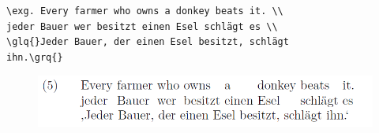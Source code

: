 \begin{frame}[fragile]


\begin{lstlisting}
\exg. Every farmer who owns a donkey beats it. \\
jeder Bauer wer besitzt einen Esel schlägt es \\
\glq{}Jeder Bauer, der einen Esel besitzt, schlägt 
ihn.\grq{}
\end{lstlisting}

\begin{figure}
	\centering
	\includegraphics[scale=.4]{../../texfiles-beamer/tex-material/WissArb-latex/linguex4}
\end{figure}

%	

\end{frame}


